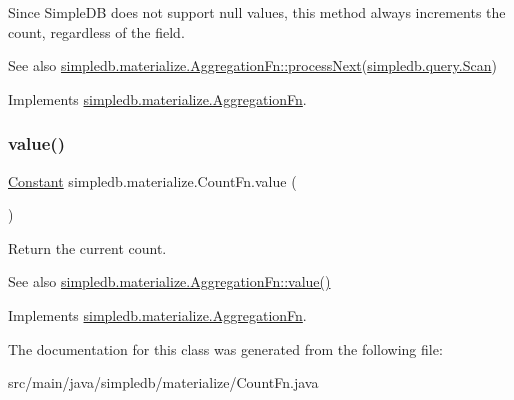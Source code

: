 Since Simple\+DB does not support null values, this method always increments the count, regardless of the field. \begin{DoxySeeAlso}{See also}
\hyperlink{interfacesimpledb_1_1materialize_1_1AggregationFn_ae2ff3fb2b1207eab18a70ecf8ffb98dc}{simpledb.\+materialize.\+Aggregation\+Fn\+::process\+Next}(\hyperlink{interfacesimpledb_1_1query_1_1Scan}{simpledb.\+query.\+Scan}) 
\end{DoxySeeAlso}


Implements \hyperlink{interfacesimpledb_1_1materialize_1_1AggregationFn_ae2ff3fb2b1207eab18a70ecf8ffb98dc}{simpledb.\+materialize.\+Aggregation\+Fn}.

\mbox{\label{classsimpledb_1_1materialize_1_1CountFn_aba7aff6e83f0f0af171edb64be6cb342}} 
\subsubsection{\texorpdfstring{value()}{value()}}
{\footnotesize\ttfamily \hyperlink{classsimpledb_1_1query_1_1Constant}{Constant} simpledb.\+materialize.\+Count\+Fn.\+value (\begin{DoxyParamCaption}{ }\end{DoxyParamCaption})\hspace{0.3cm}{\ttfamily [inline]}}

Return the current count. \begin{DoxySeeAlso}{See also}
\hyperlink{interfacesimpledb_1_1materialize_1_1AggregationFn_a65957d8075e508ef5555e3bf6ba16184}{simpledb.\+materialize.\+Aggregation\+Fn\+::value()} 
\end{DoxySeeAlso}


Implements \hyperlink{interfacesimpledb_1_1materialize_1_1AggregationFn_a65957d8075e508ef5555e3bf6ba16184}{simpledb.\+materialize.\+Aggregation\+Fn}.



The documentation for this class was generated from the following file\+:\begin{DoxyCompactItemize}
\item 
src/main/java/simpledb/materialize/Count\+Fn.\+java\end{DoxyCompactItemize}
